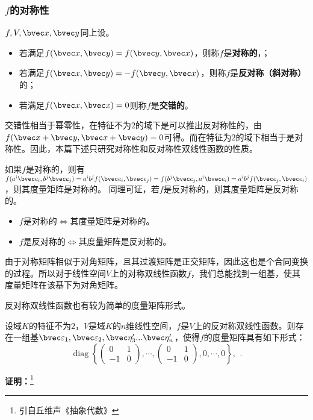 \subsubsection{$f$的对称性}
\begin{definition}{}
$f,V,\bvec x,\bvec y$同上设。
\begin{itemize}
\item 若满足$f(\bvec x,\bvec y)=f(\bvec y,\bvec x)$，则称$f$是\textbf{对称的}，；
\item 若满足$f(\bvec x,\bvec y)=-f(\bvec y,\bvec x)$，则称$f$是\textbf{反对称（斜对称）}的；
\item 若满足$f(\bvec x,\bvec x)=0$则称$f$是\textbf{交错的}。
\end{itemize}
\end{definition}
交错性相当于幂零性，在特征不为$2$的域下是可以推出反对称性的，由$f(\bvec x+\bvec y,\bvec x+\bvec y)=0$可得。而在特征为$2$的域下相当于是对称性。因此，本篇下述只研究对称性和反对称性双线性函数的性质。

如果$f$是对称的，则有$f(a^i\bvec e_i,b^j\bvec e_j)=a^ib^jf(\bvec e_i,\bvec e_j)=f(b^j\bvec e_j,a^i\bvec e_i)=a^ib^jf(\bvec e_j,\bvec e_i)$，则其度量矩阵是对称的。
同理可证，若$f$是反对称的，则其度量矩阵是反对称的。
\begin{itemize}
\item $f$是对称的$\Leftrightarrow$其度量矩阵是对称的。
\item $f$是反对称的$\Leftrightarrow$其度量矩阵是反对称的。
\end{itemize}

由于对称矩阵相似于对角矩阵，且其过渡矩阵是正交矩阵，因此这也是个合同变换的过程。所以对于线性空间$V$上的对称双线性函数$f$，我们总能找到一组基，使其度量矩阵在该基下为对角矩阵。

反对称双线性函数也有较为简单的度量矩阵形式。
\begin{theorem}{}
设域$K$的特征不为$2$，$V$是域$K$的$n$维线性空间，$f$是$V$上的反对称双线性函数。则存在一组基$\bvec \varepsilon_1,\bvec \varepsilon_2,\bvec \eta'_3...\bvec \eta'_n$，使得$f$的度量矩阵具有如下形式：
\begin{equation}
\operatorname{diag}\left\{\left(\begin{array}{rr}
0 & 1 \\
-1 & 0
\end{array}\right), \cdots,\left(\begin{array}{rr}
0 & 1 \\
-1 & 0
\end{array}\right), 0, \cdots, 0\right\} \text {, }
~.\end{equation}
\end{theorem}
\textbf{证明：}\footnote{引自丘维声《抽象代数》}

